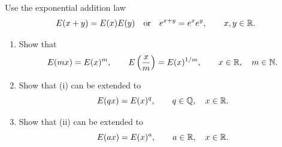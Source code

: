 \begingroup
\renewcommand{\labelenumi}{(\roman{enumi})}
\begin{exercise}
  \label{ex:hw06:exponential-scaling}
  Use the exponential addition law
  \[
    E(x+y)=E(x)E(y)\quad\text{or}\quad
    e^{x+y}=e^x e^y,\qquad x,y\in\mathbb{R}.
  \]
  \begin{enumerate}
    \item Show that
      \[
        E(mx)=E(x)^m,\qquad E\left(\frac{x}{m}\right)=E(x)^{1/m},
        \qquad x\in\mathbb{R},\quad m\in\mathbb{N}.
      \]
    \item Show that (i) can be extended to
      \[
        E(qx)=E(x)^q,\qquad q\in\mathbb{Q},\quad x\in\mathbb{R}.
      \]
    \item Show that (ii) can be extended to
      \[
        E(ax)=E(x)^a,\qquad a\in\mathbb{R},\quad x\in\mathbb{R}.
      \]
  \end{enumerate}
\end{exercise}
\endgroup
